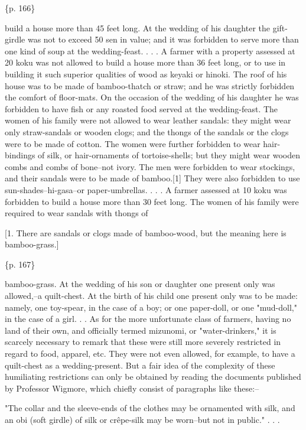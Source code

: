 \{p. 166\}

build a house more than 45 feet long. At the wedding of his daughter the gift-girdle was not to exceed 50 sen in value; and it was forbidden to serve more than one kind of soup at the wedding-feast. . . . A farmer with a property assessed at 20 koku was not allowed to build a house more than 36 feet long, or to use in building it such superior qualities of wood as keyaki or hinoki. The roof of his house was to be made of bamboo-thatch or straw; and he was strictly forbidden the comfort of floor-mats. On the occasion of the wedding of his daughter he was forbidden to have fish or any roasted food served at the wedding-feast. The women of his family were not allowed to wear leather sandals: they might wear only straw-sandals or wooden clogs; and the thongs of the sandals or the clogs were to be made of cotton. The women were further forbidden to wear hair-bindings of silk, or hair-ornaments of tortoise-shells; but they might wear wooden combs and combs of bone--not ivory. The men were forbidden to wear stockings, and their sandals were to be made of bamboo.[1] They were also forbidden to use sun-shades--hi-gasa--or paper-umbrellas. . . . A farmer assessed at 10 koku was forbidden to build a house more than 30 feet long. The women of his family were required to wear sandals with thongs of

[1. There are sandals or clogs made of bamboo-wood, but the meaning here is bamboo-grass.]

\{p. 167\}

bamboo-grass. At the wedding of his son or daughter one present only was allowed,--a quilt-chest. At the birth of his child one present only was to be made: namely, one toy-spear, in the case of a boy; or one paper-doll, or one "mud-doll," in the case of a girl. . . As for the more unfortunate class of farmers, having no land of their own, and officially termed mizunomi, or "water-drinkers," it is scarcely necessary to remark that these were still more severely restricted in regard to food, apparel, etc. They were not even allowed, for example, to have a quilt-chest as a wedding-present. But a fair idea of the complexity of these humiliating restrictions can only be obtained by reading the documents published by Professor Wigmore, which chiefly consist of paragraphs like these:--

"The collar and the sleeve-ends of the clothes may be ornamented with silk, and an obi (soft girdle) of silk or crêpe-silk may be worn--but not in public." . . .

